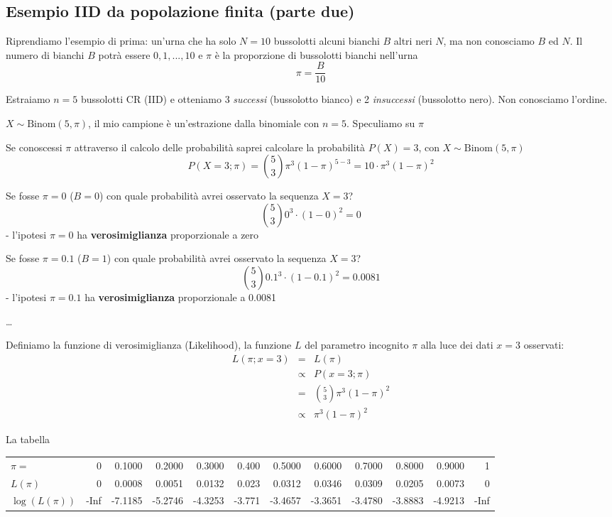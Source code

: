 \documentclass[
  11pt,
]{book}
\theoremstyle{mytheoremstyle}
\theoremstyle{mydefstyle}
\begin{document}
\subsection{Esempio IID da popolazione finita (parte due)}\label{esempio-iid-da-popolazione-finita-parte-due}

Riprendiamo l'esempio di prima: un'urna che ha solo \(N=10\) bussolotti alcuni bianchi \(B\) altri neri \(N\), ma non conosciamo \(B\) ed \(N\).
Il numero di bianchi \(B\) potrà essere \(0, 1,...,10\) e
\(\pi\) è la proporzione di bussolotti bianchi nell'urna
\[\pi=\frac B{10}\]

Estraiamo \(n=5\) bussolotti CR (IID) e otteniamo
3 \emph{successi} (bussolotto bianco) e 2 \emph{insuccessi} (bussolotto nero).
Non conosciamo l'ordine.

\(X\sim\text{Binom}(5,\pi)\), il mio campione è un'estrazione dalla binomiale con \(n=5\).
Speculiamo su \(\pi\)

Se conoscessi \(\pi\) attraverso il calcolo delle probabilità saprei calcolare la probabilità \(P(X)=3\), con \(X\sim\text{Binom}(5,\pi)\)
\[
P(X=3;\pi) =   \binom{5}{3}\pi^3(1-\pi)^{5-3} =10\cdot \pi^3(1-\pi)^2
\]

Se fosse \(\pi=0\) (\(B=0\)) con quale probabilità avrei osservato la sequenza \(X=3\)?
\[\binom{5}{3}0^3\cdot(1-0)^2=0\]
- l'ipotesi \(\pi=0\) ha \textbf{verosimiglianza} proporzionale a zero

Se fosse \(\pi=0.1\) (\(B=1\)) con quale probabilità avrei osservato la sequenza \(X=3\)?
\[\binom{5}{3}0.1^3\cdot(1-0.1)^2=0.0081\]
- l'ipotesi \(\pi=0.1\) ha \textbf{verosimiglianza} proporzionale a 0.0081

\ldots{}

Definiamo la funzione di verosimiglianza (Likelihood), la funzione \(L\) del parametro incognito \(\pi\) alla luce dei dati \(x=3\) osservati:
\begin{eqnarray*}
  L(\pi;x=3) &=& L(\pi) \\
            &\propto& P(x=3;\pi)\\
            &=& \binom{5}{3}\pi^3(1-\pi)^2\\
            &\propto& \pi^3(1-\pi)^2
\end{eqnarray*}

La tabella

\begin{tabular}{lrrrrrrrrrrr}
\toprule
$\pi=$ & 0 & 0.1000 & 0.2000 & 0.3000 & 0.400 & 0.5000 & 0.6000 & 0.7000 & 0.8000 & 0.9000 & 1\\
$L(\pi)$ & 0 & 0.0008 & 0.0051 & 0.0132 & 0.023 & 0.0312 & 0.0346 & 0.0309 & 0.0205 & 0.0073 & 0\\
$\log(L(\pi))$ & -Inf & -7.1185 & -5.2746 & -4.3253 & -3.771 & -3.4657 & -3.3651 & -3.4780 & -3.8883 & -4.9213 & -Inf\\
\bottomrule
\end{tabular}
\end{document}
